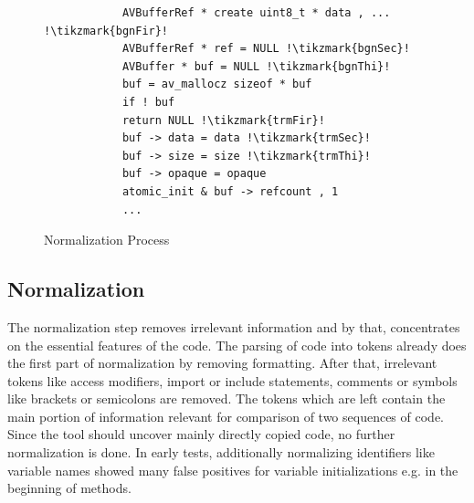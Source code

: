\begin{figure}[h]
	\centering
	\begin{minipage}{1.2\linewidth}
		\begin{minipage}{0.35\linewidth}
			\scriptsize
			
		\end{minipage}
		\begin{minipage}{0.23\linewidth}
			\scriptsize
			\begin{lstlisting}
			AVBufferRef * create uint8_t * data , ... !\tikzmark{bgnFir}!
			AVBufferRef * ref = NULL !\tikzmark{bgnSec}!
			AVBuffer * buf = NULL !\tikzmark{bgnThi}!
			buf = av_mallocz sizeof * buf
			if ! buf
			return NULL !\tikzmark{trmFir}!
			buf -> data = data !\tikzmark{trmSec}!
			buf -> size = size !\tikzmark{trmThi}!
			buf -> opaque = opaque
			atomic_init & buf -> refcount , 1
			...
			\end{lstlisting}
			
			
		\end{minipage}
	\end{minipage}
	\caption{Normalization Process}\label{fig:normalization}
\end{figure}

\subsection{Normalization}\label{section:implementation/creating_index/normalization}
The normalization step removes irrelevant information and by that, concentrates on the essential features of the code.
The parsing of code into tokens already does the first part of normalization by removing formatting.
After that, irrelevant tokens like access modifiers, import or include statements, comments or symbols like brackets or semicolons are removed.
The tokens which are left contain the main portion of information relevant for comparison of two sequences of code.
Since the tool should uncover mainly directly copied code, no further normalization is done.
In early tests, additionally normalizing identifiers like variable names showed many false positives for variable initializations e.g. in the beginning of methods.


